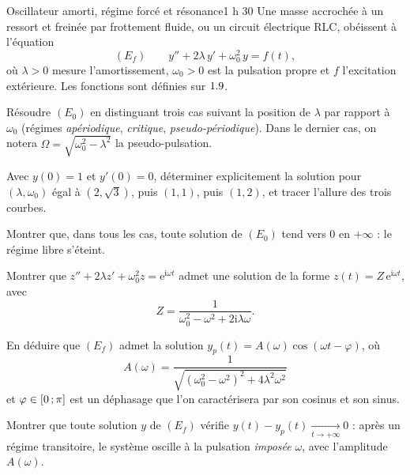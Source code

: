 

\begin{defi}{Oscillateur amorti, régime forcé et résonance}{1 h 30}
Une masse accrochée à un ressort et freinée par frottement fluide, ou un
circuit électrique RLC, obéissent à l'équation
\[
(E_f)\qquad y''+2\lambda\,y'+\omega_0^{2}\,y=f(t),
\]
où $\lambda>0$ mesure l'amortissement, $\omega_0>0$ est la pulsation propre
et $f$ l'excitation extérieure. Les fonctions sont définies sur $1.9$.

\begin{questions}
  \item Résoudre $(E_0)$ en distinguant trois cas suivant la position de
    $\lambda$ par rapport à $\omega_0$ (régimes \emph{apériodique},
    \emph{critique}, \emph{pseudo-périodique}). Dans le dernier cas, on
    notera $\Omega=\sqrt{\omega_0^{2}-\lambda^{2}}$ la pseudo-pulsation.
  \item Avec $y(0)=1$ et $y'(0)=0$, déterminer explicitement la solution
    pour $(\lambda,\omega_0)$ égal à $(2,\sqrt3)$, puis $(1,1)$, puis
    $(1,2)$, et tracer l'allure des trois courbes.
  \item Montrer que, dans tous les cas, toute solution de $(E_0)$ tend
    vers $0$ en $+\infty$ : le régime libre s'éteint.
\end{questions}

\begin{questions}[resume]
  \item Montrer que $z''+2\lambda z'+\omega_0^{2}z=\mathrm{e}^{\mathrm{i}\omega t}$
    admet une solution de la forme $z(t)=Z\,\mathrm{e}^{\mathrm{i}\omega t}$,
    avec
    \[
    Z=\frac{1}{\omega_0^{2}-\omega^{2}+2\mathrm{i}\lambda\omega} .
    \]
  \item En déduire que $(E_f)$ admet la solution
    $y_p(t)=A(\omega)\cos(\omega t-\varphi)$, où
    \[
    A(\omega)=\frac{1}{\sqrt{(\omega_0^{2}-\omega^{2})^{2}+4\lambda^{2}\omega^{2}}}
    \]
    et $\varphi\in\mathopen{[}0\,{;}\,\pi\mathclose{]}$ est un déphasage que l'on caractérisera
    par son cosinus et son sinus.
  \item Montrer que toute solution $y$ de $(E_f)$ vérifie
    $y(t)-y_p(t)\xrightarrow[t\to+\infty]{}0$ : après un régime
    transitoire, le système oscille à la pulsation \emph{imposée}
    $\omega$, avec l'amplitude $A(\omega)$.
\end{questions}


\end{defi}
